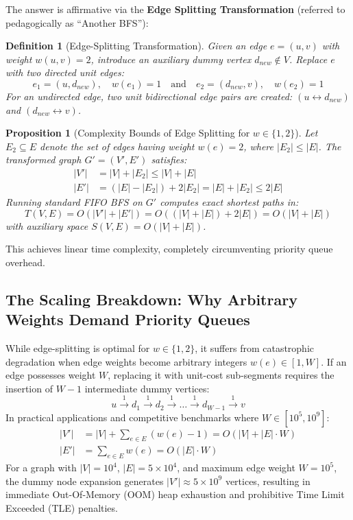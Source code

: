 \documentclass[10pt,journal,compsoc,onecolumn]{IEEEtran}
\newtheorem{definition}[theorem]{Definition}
\newtheorem{proposition}[theorem]{Proposition}
\begin{document}
The answer is affirmative via the \textbf{Edge Splitting Transformation} (referred to pedagogically as ``Another BFS''):
\begin{definition}[Edge-Splitting Transformation]
Given an edge $e = (u, v)$ with weight $w(u, v) = 2$, introduce an auxiliary dummy vertex $d_{new} \notin V$. Replace $e$ with two directed unit edges:
\begin{equation}
e_1 = (u, d_{new}), \quad w(e_1) = 1 \quad \text{and} \quad e_2 = (d_{new}, v), \quad w(e_2) = 1
\end{equation}
For an undirected edge, two unit bidirectional edge pairs are created: $(u \leftrightarrow d_{new})$ and $(d_{new} \leftrightarrow v)$.
\end{definition}

\begin{proposition}[Complexity Bounds of Edge Splitting for $w \in \{1, 2\}$]
Let $E_2 \subseteq E$ denote the set of edges having weight $w(e) = 2$, where $|E_2| \le |E|$. The transformed graph $G' = (V', E')$ satisfies:
\begin{align}
|V'| &= |V| + |E_2| \le |V| + |E| \\
|E'| &= (|E| - |E_2|) + 2|E_2| = |E| + |E_2| \le 2|E|
\end{align}
Running standard FIFO BFS on $G'$ computes exact shortest paths in:
\begin{equation}
T(V, E) = O(|V'| + |E'|) = O((|V| + |E|) + 2|E|) = O(|V| + |E|)
\end{equation}
with auxiliary space $S(V, E) = O(|V| + |E|)$.
\end{proposition}

This achieves linear time complexity, completely circumventing priority queue overhead.

\subsection{The Scaling Breakdown: Why Arbitrary Weights Demand Priority Queues}
While edge-splitting is optimal for $w \in \{1, 2\}$, it suffers from catastrophic degradation when edge weights become arbitrary integers $w(e) \in [1, W]$. If an edge possesses weight $W$, replacing it with unit-cost sub-segments requires the insertion of $W - 1$ intermediate dummy vertices:
\begin{equation}
u \xrightarrow{1} d_1 \xrightarrow{1} d_2 \xrightarrow{1} \dots \xrightarrow{1} d_{W-1} \xrightarrow{1} v
\end{equation}
In practical applications and competitive benchmarks where $W \in [10^5, 10^9]$:
\begin{align}
|V'| &= |V| + \sum_{e \in E} (w(e) - 1) = O(|V| + |E| \cdot W) \\
|E'| &= \sum_{e \in E} w(e) = O(|E| \cdot W)
\end{align}
For a graph with $|V| = 10^4$, $|E| = 5 \times 10^4$, and maximum edge weight $W = 10^5$, the dummy node expansion generates $|V'| \approx 5 \times 10^9$ vertices, resulting in immediate Out-Of-Memory (OOM) heap exhaustion and prohibitive Time Limit Exceeded (TLE) penalties.
\end{document}
